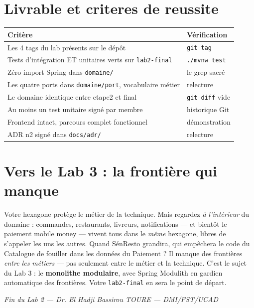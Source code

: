 \documentclass[a4paper,11pt]{article}
\begin{document}
\section{Livrable et criteres de reussite}

\begin{center}
\small
\begin{tabular}{p{}p{}}
\toprule
\textbf{Critère} & \textbf{Vérification} \\
\midrule
Les 4 tags du lab présents sur le dépôt & \texttt{git tag} \\
Tests d'intégration ET unitaires verts sur \texttt{lab2-final} & \texttt{./mvnw test} \\
Zéro import Spring dans \texttt{domaine/} & le grep sacré \\
Les quatre ports dans \texttt{domaine/port}, vocabulaire métier & relecture \\
Le domaine identique entre etape2 et final & \texttt{git diff} vide \\
Au moins un test unitaire signé par membre & historique Git \\
Frontend intact, parcours complet fonctionnel & démonstration \\
ADR n\up{o}2 signé dans \texttt{docs/adr/} & relecture \\
\bottomrule
\end{tabular}
\end{center}

\section{Vers le Lab 3 : la frontière qui manque}

Votre hexagone protège le métier de la technique. Mais regardez
\emph{à l'intérieur} du domaine : commandes, restaurants, livreurs,
notifications --- et bientôt le paiement mobile money --- vivent tous dans
le \emph{même} hexagone, libres de s'appeler les uns les autres. Quand
SénResto grandira, qui empêchera le code du Catalogue de fouiller dans
les données du Paiement ? Il manque des frontières \emph{entre les
métiers} --- pas seulement entre le métier et la technique. C'est le
sujet du Lab 3 : le \textbf{monolithe modulaire}, avec Spring Modulith
en gardien automatique des frontières. Votre \texttt{lab2-final} en sera
le point de départ.

\vspace{1em}
\begin{center}
\textit{Fin du Lab 2 --- Dr. El Hadji Bassirou TOURE --- DMI/FST/UCAD}
\end{center}
\end{document}
